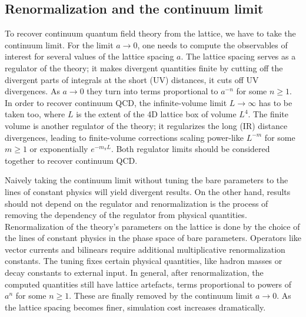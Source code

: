 

\subsection{Renormalization and the continuum limit}


To recover continuum quantum field theory from the lattice, we have to take the continuum limit.
For the limit $a \to 0$, one needs to compute the observables of interest for several values of the lattice spacing $a$.
The lattice spacing serves as a regulator of the theory; it makes divergent quantities finite by cutting off the divergent parts of integrals at the short (UV) distances, \ie it cuts off UV divergences.
As $a \to 0$ they turn into terms proportional to $a^{-n}$ for some $n \geq 1$.
In order to recover continuum QCD, the infinite-volume limit $L \to \infty$ has to be taken too, where $L$ is the extent of the 4D lattice box of volume $L^{4}$.
The finite volume is another regulator of the theory; it regularizes the long (IR) distance divergences, leading to finite-volume corrections scaling power-like $L^{-m}$ for some $m \geq 1$ or exponentially $e^{-m_{\pi} L}$.
Both regulator limits should be considered together to recover continuum QCD.

Naively taking the continuum limit without tuning the bare parameters to the lines of constant physics will yield divergent results.
On the other hand, results should not depend on the regulator and renormalization is the process of removing the dependency of the regulator from physical quantities.
Renormalization of the theory's parameters on the lattice is done by the choice of the lines of constant physics in the phase space of bare parameters.
Operators like vector currents and bilinears require additional multiplicative renormalization constants.
The tuning fixes certain physical quantities, like hadron masses or decay constants to external input.
In general, after renormalization, the computed quantities still have lattice artefacts, \ie terms proportional to powers of $a^{n}$ for some $n \geq 1$.
These are finally removed by the continuum limit $a \to 0$.
As the lattice spacing becomes finer, simulation cost increases dramatically.

